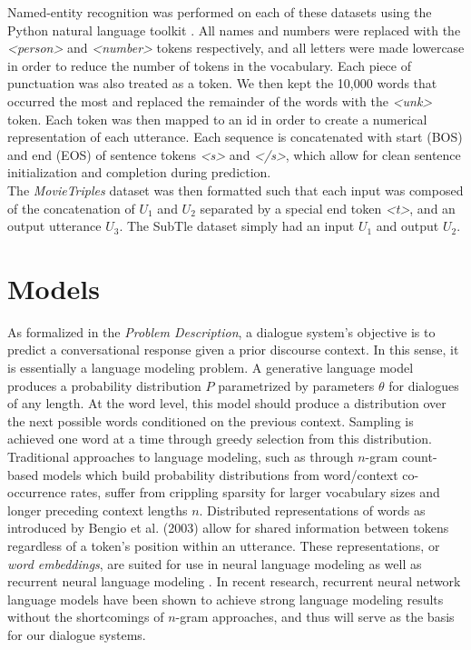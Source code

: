 \documentclass[11pt]{article}
\begin{document}
Named-entity recognition was performed on each of these datasets using the Python natural language toolkit \cite{nltk}. All names and numbers were replaced with the \textit{\textless person\textgreater} and \textit{\textless number\textgreater} tokens respectively, and all letters were made lowercase in order to reduce the number of tokens in the vocabulary. Each piece of punctuation was also treated as a token. We then kept the 10,000 words that occurred the most and replaced the remainder of the words with the \textit{\textless unk\textgreater} token. Each token was then mapped to an id in order to create a numerical representation of each utterance. Each sequence is concatenated with start (BOS) and end (EOS) of sentence tokens \textit{\textless s\textgreater} and \textit{\textless /s\textgreater}, which allow for clean sentence initialization and completion during prediction.\\

\noindent The {\it MovieTriples} dataset was then formatted such that each input was composed of the concatenation of $U_1$ and $U_2$ separated by a special end token \textit{\textless t\textgreater}, and an output utterance $U_3$. The SubTle dataset simply had an input $U_1$ and output $U_2$.

\section{Models}

As formalized in the {\it Problem Description}, a dialogue system's objective is to predict a conversational response given a prior discourse context. In this sense, it is essentially a language modeling problem. A generative language model produces a probability distribution $P$ parametrized by parameters $\theta$ for dialogues of any length. At the word level, this model should produce a distribution over the next possible words conditioned on the previous context. Sampling is achieved one word at a time through greedy selection from this distribution. \\

\noindent Traditional approaches to language modeling, such as through $n$-gram count-based models which build probability distributions from word/context co-occurrence rates, suffer from crippling sparsity for larger vocabulary sizes and longer preceding context lengths $n$. Distributed representations of words as introduced by Bengio et al. (2003) \cite{bengio-emb} allow for shared information between tokens regardless of a token's position within an utterance. These representations, or {\it word embeddings}, are suited for use in neural language modeling \cite{bengio-emb} as well as recurrent neural language modeling \cite{mikolov-rnn}. In recent research, recurrent neural network language models have been shown to achieve strong language modeling results without the shortcomings of $n$-gram approaches, and thus will serve as the basis for our dialogue systems.
\end{document}
